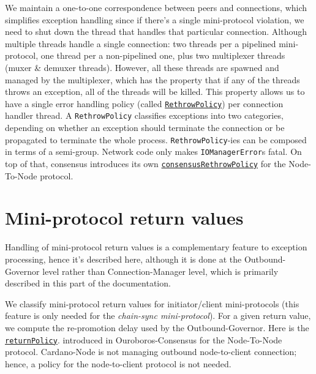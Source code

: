 We maintain a one-to-one correspondence between peers and connections, which
simplifies exception handling since if there's a single mini-protocol
violation, we need to shut down the thread that handles that particular
connection.  Although multiple threads handle a single connection: two
threads per a pipelined mini-protocol, one thread per a non-pipelined one, plus
two multiplexer threads (muxer \& demuxer threads).  However, all these threads
are spawned and managed by the multiplexer, which has the property that if any
of the threads throws an exception, all of the threads will be killed.  This
property allows us to have a single error handling policy (called
\href{https://ouroboros-network.cardano.intersectmbo.org/ouroboros-network/framework/Ouroboros-Network-RethrowPolicy.html\#t:RethrowPolicy}{\texttt{RethrowPolicy}})
per connection handler thread. A \texttt{RethrowPolicy} classifies exceptions
into two categories, depending on whether an exception should terminate the
connection or be propagated to terminate the whole process.
\texttt{RethrowPolicy}-ies can be composed in terms of a semi-group.  Network
code only makes \texttt{IOManagerError}s fatal.  On top of that, consensus
introduces its own
\href{https://ouroboros-consensus.cardano.intersectmbo.org/haddocks/ouroboros-consensus-diffusion/Ouroboros-Consensus-Node-RethrowPolicy.html\#v:consensusRethrowPolicy}{\texttt{consensusRethrowPolicy}}
for the Node-To-Node protocol.

\section{Mini-protocol return values}
\label{sec:mini-protocol-return-values}

Handling of mini-protocol return values is a complementary feature to exception
processing, hence it's described here, although it is done at the
Outbound-Governor level rather than Connection-Manager level, which is primarily
described in this part of the documentation.

We classify mini-protocol return values for initiator/client mini-protocols
(this feature is only needed for the \textit{chain-sync
mini-protocol}). For a given return value, we compute the re-promotion delay used by
the Outbound-Governor. Here is the
\href{https://ouroboros-consensus.cardano.intersectmbo.org/haddocks/ouroboros-consensus-diffusion/Ouroboros-Consensus-Node-ExitPolicy.html\#v:returnPolicy}{\texttt{returnPolicy}}.
introduced in Ouroboros-Consensus for the Node-To-Node protocol.  Cardano-Node
is not managing outbound node-to-client connection; hence, a policy for
the node-to-client protocol is not needed.

